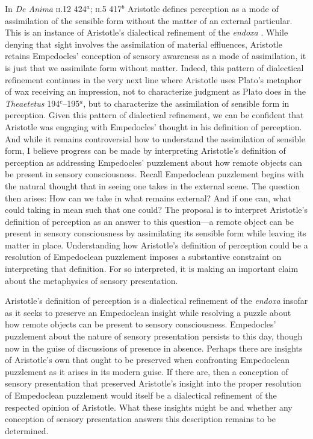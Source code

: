 \documentclass[12pt]{article}
\begin{document}
In \emph{De Anima} \textsc{ii}.12 424\( ^{a} \); \textsc{ii}.5 417\( ^{b} \) Aristotle defines perception as a mode of assimilation of the sensible form without the matter of an external particular. This is an instance of Aristotle's dialectical refinement of the \emph{endoxa} \citep[on Aristotle's dialectic in \emph{De Anima} see][]{Witt:1995kx}. While denying that sight involves the assimilation of material effluences, Aristotle retains Empedocles' conception of sensory awareness as a mode of assimilation, it is just that we assimilate form without matter. Indeed, this pattern of dialectical refinement continues in the very next line where Aristotle uses Plato's metaphor of  wax receiving an impression, not to characterize judgment as Plato does in the \emph{Theaetetus} 194\( ^{c} \)--195\( ^{a} \), but to characterize the assimilation of sensible form in perception. Given this pattern of dialectical refinement, we can be confident that Aristotle was engaging with Empedocles' thought in his definition of perception. And while it remains controversial how to understand the assimilation of sensible form, I believe progress can be made by interpreting Aristotle's definition of perception as addressing Empedocles' puzzlement about how remote objects can be present in sensory consciousness. Recall Empedoclean puzzlement begins with the natural thought that in seeing one takes in the external scene. The question then arises: How can we take in what remains external? And if one can, what could taking in mean such that one could? The proposal is to interpret Aristotle's definition of perception as an answer to this question---a remote object can be present in sensory consciousness by assimilating its sensible form while leaving its matter in place. Understanding how Aristotle's definition of perception could be a resolution of Empedoclean puzzlement imposes a substantive constraint on interpreting that definition. For so interpreted, it is making an important claim about the metaphysics of sensory presentation.

Aristotle's definition of perception is a dialectical refinement of the \emph{endoxa} insofar as it seeks to preserve an Empedoclean insight while resolving a puzzle about how remote objects can be present to sensory consciousness. Empedocles' puzzlement about the nature of sensory presentation persists to this day, though now in the guise of discussions of presence in absence. Perhaps there are insights of Aristotle's own that ought to be preserved when confronting Empedoclean puzzlement as it arises in its modern guise. If there are, then a conception of sensory presentation that preserved Aristotle's insight into the proper resolution of Empedoclean puzzlement would itself be a dialectical refinement of the respected opinion of Aristotle. What these insights might be and whether any conception of sensory presentation answers this description remains to be determined.
\end{document}
